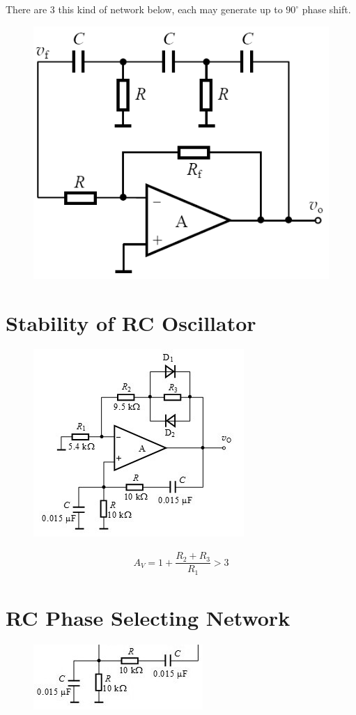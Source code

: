 There are 3 this kind of network below, each may generate up to $90^{\circ}$ phase shift.

\begin{figure}[H]
  \centering
  \includegraphics[width=0.5\linewidth]{figures/RC-Phase-Shifting}
\end{figure}

\section{Stability of RC Oscillator}

\begin{figure}[H]
  \centering
  \includegraphics[width=0.5\linewidth]{figures/Stability-RC-Oscillator}
\end{figure}

\begin{equation*}
  \begin{aligned}
    A_V = 1 + \dfrac{R_2 + R_3}{R_1} > 3 
  \end{aligned}
\end{equation*}

\section{RC Phase Selecting Network}

\begin{figure}[H]
  \centering
  \includegraphics[width=0.5\linewidth]{figures/RC-Selecting-Network}
\end{figure}

